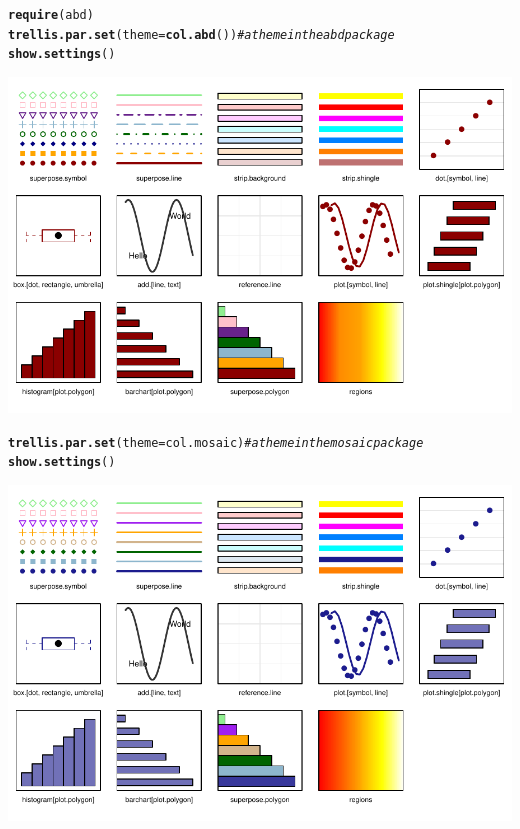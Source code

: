 \documentclass[twoside]{book}\usepackage[]{graphicx}\usepackage[]{xcolor}
\makeatletter
\def\maxwidth{ %
  \ifdim\Gin@nat@width>\linewidth
    \linewidth
  \else
    \Gin@nat@width
  \fi
}
\newcommand{\hlcom}[1]{\textcolor[rgb]{0.678,0.584,0.686}{\textit{#1}}}%
\newcommand{\hlstd}[1]{\textcolor[rgb]{0.345,0.345,0.345}{#1}}%
\newcommand{\hlkwc}[1]{\textcolor[rgb]{0.333,0.667,0.333}{#1}}%
\newcommand{\hlkwd}[1]{\textcolor[rgb]{0.737,0.353,0.396}{\textbf{#1}}}%
\newenvironment{kframe}{%
 \def\at@end@of@kframe{}%
 \ifinner\ifhmode%
  \def\at@end@of@kframe{\end{minipage}}%
  \begin{minipage}{\columnwidth}%
 \fi\fi%
 \def\FrameCommand##1{\hskip\@totalleftmargin \hskip-\fboxsep
 \colorbox{shadecolor}{##1}\hskip-\fboxsep
     \hskip-\linewidth \hskip-\@totalleftmargin \hskip\columnwidth}%
 \MakeFramed {\advance\hsize-\width
   \@totalleftmargin\z@ \linewidth\hsize
   \@setminipage}}%
 {\par\unskip\endMakeFramed%
 \at@end@of@kframe}
\newenvironment{knitrout}{}{} %
\makeatother
\begin{document}
\begin{knitrout}
\color{fgcolor}\begin{kframe}
\begin{alltt}
\hlkwd{require}\hlstd{(abd)}
\hlkwd{trellis.par.set}\hlstd{(}\hlkwc{theme} \hlstd{=} \hlkwd{col.abd}\hlstd{())}  \hlcom{# a theme in the abd package}
\hlkwd{show.settings}\hlstd{()}
\end{alltt}
\end{kframe}

{\centering \includegraphics[width=\maxwidth,height=.4\textheight]{figures/fig-themes-abd-1} 

}



\end{knitrout}
\begin{knitrout}
\color{fgcolor}\begin{kframe}
\begin{alltt}
\hlkwd{trellis.par.set}\hlstd{(}\hlkwc{theme} \hlstd{= col.mosaic)}  \hlcom{# a theme in the mosaic package}
\hlkwd{show.settings}\hlstd{()}
\end{alltt}
\end{kframe}

{\centering \includegraphics[width=\maxwidth,height=.4\textheight]{figures/fig-themes-mosaic-1} 

}



\end{knitrout}
\end{document}
